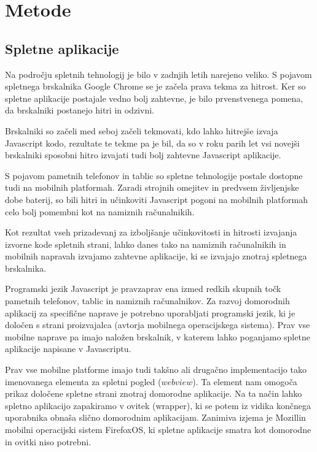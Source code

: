 \chapter{Metode}

\section{Spletne aplikacije}

Na področju spletnih tehnologij je bilo v zadnjih letih narejeno veliko. S pojavom spletnega brskalnika Google Chrome se je začela prava tekma za hitrost. Ker so spletne aplikacije postajale vedno bolj zahtevne, je bilo prvenstvenega pomena, da brskalniki postanejo hitri in odzivni.

Brskalniki so začeli med seboj začeli tekmovati, kdo lahko hitrejše izvaja Javascript kodo, rezultate te tekme pa je bil, da so v roku parih let vsi novejši brskalniki sposobni hitro izvajati tudi bolj zahtevne Javascript aplikacije. 

S pojavom pametnih telefonov in tablic so spletne tehnologije postale dostopne tudi na mobilnih platformah. Zaradi strojnih omejitev in predvsem življenjske dobe baterij, so bili hitri in učinkoviti Javascript pogoni na mobilnih platformah celo bolj pomembni kot na namiznih računalnikih.

Kot rezultat vseh prizadevanj za izboljšanje učinkovitosti in hitrosti izvajanja izvorne kode spletnih strani, lahko danes tako na namiznih računalnikih in mobilnih napravah izvajamo zahtevne aplikacije, ki se izvajajo znotraj spletnega brskalnika.

Programski jezik Javascript je pravzaprav ena izmed redkih skupnih točk pametnih telefonov, tablic in namiznih računalnikov. Za razvoj domorodnih aplikacij za specifične naprave je potrebno uporabljati programski jezik, ki je določen s strani proizvajalca (avtorja mobilnega operacijskega sistema). Prav vse mobilne naprave pa imajo naložen brskalnik, v katerem lahko poganjamo spletne aplikacije napisane v Javascriptu.

Prav vse mobilne platforme imajo tudi takšno ali drugačno implementacijo tako imenovanega elementa za spletni pogled ($webview$). Ta element nam omogoča prikaz določene spletne strani znotraj domorodne aplikacije. Na ta način lahko spletno aplikacijo zapakiramo v ovitek (wrapper), ki se potem iz vidika končnega uporabnika obnaša slično domorodnim aplikacijam. Zanimiva izjema je Mozillin mobilni operacijski sistem FirefoxOS, ki spletne aplikacije smatra kot domorodne in ovitki niso potrebni.

